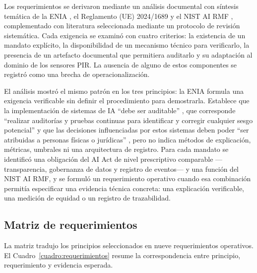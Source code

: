 Los requerimientos se derivaron mediante un análisis documental con síntesis
temática de la ENIA \cite{micitt2024enia}, el Reglamento (UE) 2024/1689
\cite{ue2024aiact} y el NIST AI RMF \cite{nist2023airmf}, complementado con
literatura seleccionada mediante un protocolo de revisión sistemática. Cada
exigencia se examinó con cuatro criterios: la existencia de un mandato
explícito, la disponibilidad de un mecanismo técnico para verificarlo, la
presencia de un artefacto documental que permitiera auditarlo y su adaptación
al dominio de los sensores PIR. La ausencia de alguno de estos componentes se
registró como una brecha de operacionalización.

El análisis mostró el mismo patrón en los tres principios: la ENIA formula una
exigencia verificable sin definir el procedimiento para demostrarla. Establece
que la implementación de sistemas de IA \enquote{debe ser auditable}
\cite[p.~32]{micitt2024enia}, que corresponde \enquote{realizar auditorías y
pruebas continuas para identificar y corregir cualquier sesgo potencial}
\cite[p.~33]{micitt2024enia} y que las decisiones influenciadas por estos
sistemas deben poder \enquote{ser atribuidas a personas físicas o jurídicas}
\cite[p.~33]{micitt2024enia}, pero no indica métodos de explicación, métricas,
umbrales ni una arquitectura de registro. Para cada mandato se identificó una
obligación del AI Act de nivel prescriptivo comparable ---transparencia,
gobernanza de datos y registro de eventos--- y una función del NIST AI RMF, y
se formuló un requerimiento operativo cuando esa combinación permitía
especificar una evidencia técnica concreta: una explicación verificable, una
medición de equidad o un registro de trazabilidad.

\subsection{Matriz de requerimientos}

La matriz tradujo los principios seleccionados en nueve requerimientos
operativos. El Cuadro~\ref{cuadro:requerimientos} resume la correspondencia
entre principio, requerimiento y evidencia esperada.

